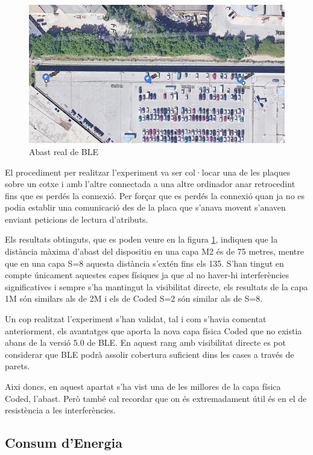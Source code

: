 \begin{figure}[!h]
	\begin{center}
		\includegraphics[width=\textwidth]{./images/prova_abast.png}
		\caption{Abast real de BLE}
		\label{abast}
	\end{center}
\end{figure}

El procediment per realitzar l'experiment va ser col·locar una de les plaques sobre un cotxe i amb l'altre connectada a una altre ordinador anar retrocedint fins que es perdés la connexió.
Per forçar que es perdés la connexió quan ja no es podia establir una comunicació des de la placa que s'anava movent s'anaven enviant peticions de lectura d'atributs.

Els resultats obtinguts, que es poden veure en la figura \ref{abast}, indiquen que la distància màxima d'abast del dispositiu en una capa M2 és de 75 metres, mentre que en una capa S=8 aquesta distància s'extén fins els 135.
S'han tingut en compte únicament aquestes capes físiques ja que al no haver-hi interferències significatives i sempre s'ha mantingut la visibilitat directe, els resultats de la capa 1M són similars als de 2M i els de Coded S=2 són similar als de S=8.

Un cop realitzat l'experiment s'han validat, tal i com s'havia comentat anteriorment, els avantatges que aporta la nova capa física Coded que no existia abans de la versió 5.0 de BLE.
En aquest rang amb visibilitat directe es pot considerar que BLE podrà assolir cobertura suficient dins les cases a través de parets.

Aixi doncs, en aquest apartat s'ha vist una de les millores de la capa física Coded, l'abast.
Però també cal recordar que on és extremadament útil és en el de resistència a les interferències.

\subsection{Consum d'Energia}

